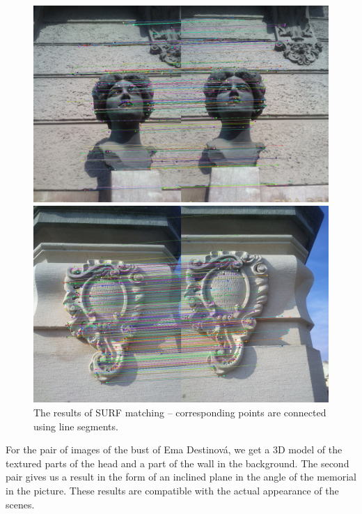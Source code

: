 \begin{figure}[H]
\centerline{
\includegraphics[width=14.0cm]{img/ema_matching.png}}
\centerline{
\includegraphics[width=14.0cm]{img/memorial_matching.png}}
\caption{The results of SURF matching -- corresponding points are connected using line segments.}
\label{fig:matching}
\end{figure}

For the pair of images of the bust of Ema Destinová, we get a 3D model of the textured parts of the head and a part of the wall in the background.
The second pair gives us a result in the form of an inclined plane in the angle of the memorial in the picture.
These results are compatible with the actual appearance of the scenes.

